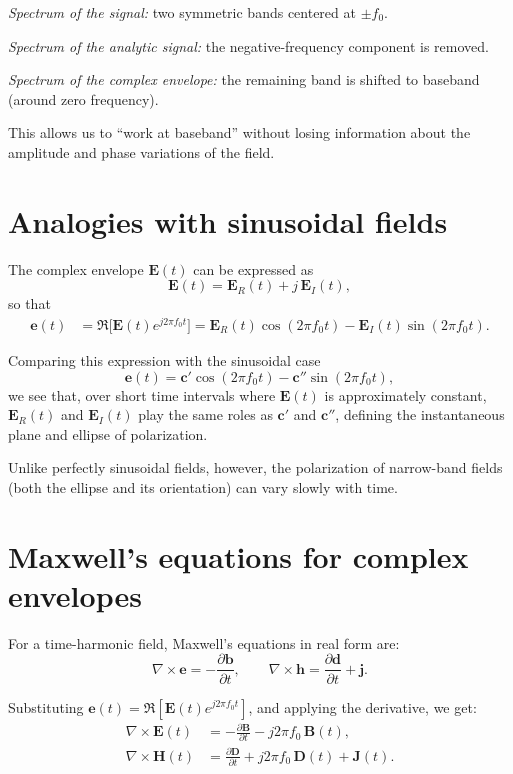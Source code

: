 \begin{center}
\textit{Spectrum of the signal:} two symmetric bands centered at $\pm f_0$.

\textit{Spectrum of the analytic signal:} the negative-frequency component is removed.

\textit{Spectrum of the complex envelope:} the remaining band is shifted to baseband (around zero frequency).
\end{center}

This allows us to “work at baseband” without losing information about the amplitude and phase variations of the field.

\section{Analogies with sinusoidal fields}

The complex envelope $\mathbf{E}(t)$ can be expressed as
\[
\mathbf{E}(t) = \mathbf{E}_R(t) + j\,\mathbf{E}_I(t),
\]
so that
\begin{align}
    \mathbf{e}(t)
    &= \Re\!\big[\mathbf{E}(t)e^{j2\pi f_0 t}\big]
     = \mathbf{E}_R(t)\cos(2\pi f_0 t)
     - \mathbf{E}_I(t)\sin(2\pi f_0 t).
\end{align}

Comparing this expression with the sinusoidal case
\[
\mathbf{e}(t) = \mathbf{c}'\cos(2\pi f_0 t) - \mathbf{c}''\sin(2\pi f_0 t),
\]
we see that, over short time intervals where $\mathbf{E}(t)$ is approximately constant,  
$\mathbf{E}_R(t)$ and $\mathbf{E}_I(t)$ play the same roles as $\mathbf{c}'$ and $\mathbf{c}''$, defining the instantaneous plane and ellipse of polarization.

Unlike perfectly sinusoidal fields, however, the polarization of narrow-band fields (both the ellipse and its orientation) can vary slowly with time.

\section{Maxwell’s equations for complex envelopes}

For a time-harmonic field, Maxwell’s equations in real form are:
\[
\nabla\times\mathbf{e} = -\frac{\partial\mathbf{b}}{\partial t}, 
\qquad
\nabla\times\mathbf{h} = \frac{\partial\mathbf{d}}{\partial t} + \mathbf{j}.
\]

Substituting $\mathbf{e}(t)=\Re[\mathbf{E}(t)e^{j2\pi f_0 t}]$, and applying the derivative, we get:
\begin{align}
    \nabla\times\mathbf{E}(t)
    &= -\frac{\partial\mathbf{B}}{\partial t} - j2\pi f_0\,\mathbf{B}(t),\\
    \nabla\times\mathbf{H}(t)
    &= \frac{\partial\mathbf{D}}{\partial t} + j2\pi f_0\,\mathbf{D}(t) + \mathbf{J}(t).
\end{align}

